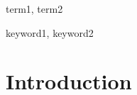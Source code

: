 \documentclass[preprint]{sigplanconf}
\newcommand\rem[2]{\textcolor{Mahogany}{{\textsf{#1}} $\triangleright$
    \textsl{#2}}}
\newcommand\mrem[1]{\rem{M}{#1}}
\newcommand\yrem[1]{\rem{Y}{#1}}
\begin{document}

\terms
term1, term2

\keywords
keyword1, keyword2

\section{Introduction}





\end{document}
